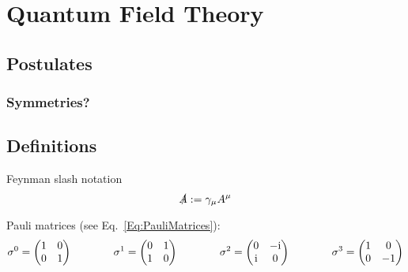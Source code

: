 \section{Quantum Field Theory} %
	\subsection{Postulates}
		\subsubsection{Symmetries?}
	\subsection{Definitions}
		Feynman slash notation
		\begin{equation}
			\slashed{A} := \gamma_\mu A^\mu
		\end{equation}

		\noindent
		Pauli matrices (see Eq.~\ref{Eq:PauliMatrices}):
		\begin{equation}
			\label{Eq:PauliMatricesQFT}
			\begin{aligned}
				\sigma^0 = \left(\begin{matrix}
					1 & 0 \\
					0 & 1 \\
				\end{matrix}\right) &&\hspace{30pt}
				\sigma^1 = \left(\begin{matrix}
					0 & 1 \\
					1 & 0 \\
				\end{matrix}\right) &&\hspace{30pt}
				\sigma^2 = \left(\begin{matrix}
					0 & -\mathrm{i} \\
						\mathrm{i} & 0 \\
				\end{matrix}\right) &&\hspace{30pt}
				\sigma^3 = \left(\begin{matrix}
					1 & 0 \\
					0 & -1 \\
				\end{matrix}\right)
			\end{aligned}
		\end{equation}


